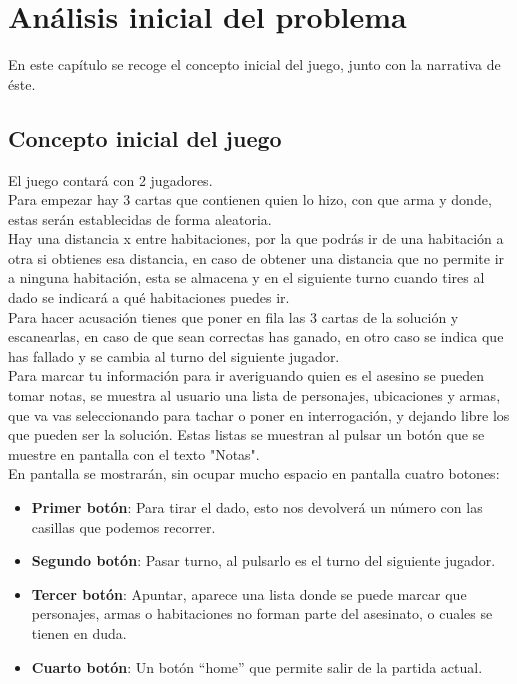 \chapter{Análisis inicial del problema}
\label{ch:analisis}
En este capítulo se recoge el concepto inicial del juego, junto con la narrativa de éste.

\section{Concepto inicial del juego}
El juego contará con 2 jugadores.\\

Para empezar hay 3 cartas que contienen quien lo hizo, con que arma y donde, estas serán establecidas de forma aleatoria.\\

Hay una distancia x entre habitaciones, por la que podrás ir de una habitación a otra si obtienes esa distancia, en caso de obtener una distancia que no permite ir a ninguna habitación, esta se almacena y en el siguiente turno cuando tires al dado se indicará a qué habitaciones puedes ir.\\

Para hacer acusación tienes que poner en fila las 3 cartas de la solución y escanearlas, en caso de que sean correctas has ganado, en otro caso se indica que has fallado y se cambia al turno del siguiente jugador.\\

Para marcar tu información para ir averiguando quien es el asesino se pueden tomar notas, se muestra al usuario una lista de personajes, ubicaciones y armas, que va vas seleccionando para tachar o poner en interrogación, y dejando libre los que pueden ser la solución. Estas listas se muestran al pulsar un botón que se muestre en pantalla con el texto "Notas".\\

En pantalla se mostrarán, sin ocupar mucho espacio en pantalla cuatro botones:
\begin{itemize}
  \item \textbf{Primer botón}: Para tirar el dado, esto nos devolverá un número con las casillas que podemos recorrer.
  \item \textbf{Segundo botón}: Pasar turno, al pulsarlo es el turno del siguiente jugador.
  \item \textbf{Tercer botón}: Apuntar, aparece una lista donde se puede marcar que personajes, armas o habitaciones no forman parte del asesinato, o cuales se tienen en duda.
  \item \textbf{Cuarto botón}: Un botón “home” que permite salir de la partida actual.
\end{itemize}

